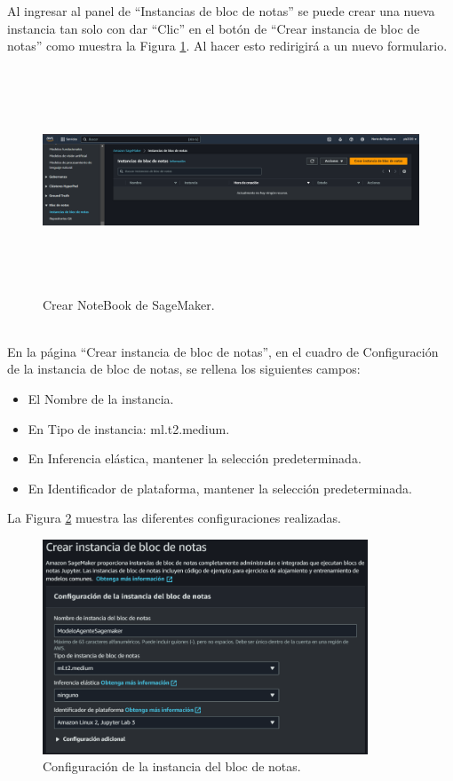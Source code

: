 \documentclass[a4paper,10pt, oneside, titlepage]{article}
\begin{document}
	\indent Al ingresar al panel de ``Instancias de bloc de notas'' se puede crear una nueva instancia tan solo con dar ``Clic'' en el botón de ``Crear instancia de bloc de notas'' como muestra la Figura \ref{Instancias_SageMaker}. Al hacer esto redirigirá a un nuevo formulario.
	\begin{figure}[!h]
		\centering
		\includegraphics[width = 1\linewidth, height = 6.7cm]{Instancias_SageMaker.png}
		\caption{Crear NoteBook de SageMaker.}
		\label{Instancias_SageMaker}
	\end{figure} \\
	\indent En la página ``Crear instancia de bloc de notas'', en el cuadro de Configuración de la instancia de bloc de notas, se rellena los siguientes campos:
	\begin{itemize}
		\item El Nombre de la instancia.
		\item En Tipo de instancia: ml.t2.medium.
		\item En Inferencia elástica, mantener la selección predeterminada.
		\item En Identificador de plataforma, mantener la selección predeterminada.
	\end{itemize}
	\indent \indent La Figura \ref{Configuracion_Instancia_SageMaker} muestra las diferentes configuraciones realizadas.
	\begin{figure}[!h]
		\centering
		\includegraphics[width = 1\linewidth, height = 6.4cm]{Configuracion_Instancia_SageMaker.png}
		\caption{Configuración de la instancia del bloc de notas.}
		\label{Configuracion_Instancia_SageMaker}
	\end{figure} \\
\end{document}
